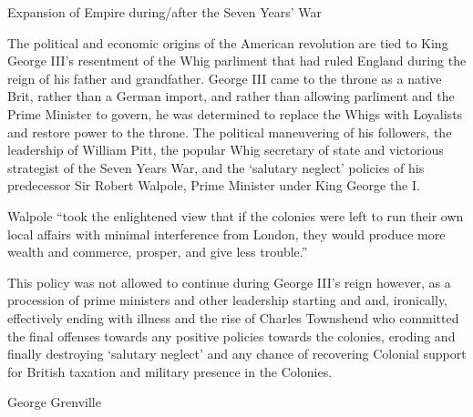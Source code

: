 \begin{quotation}\end{quotation}

Expansion of Empire during/after the Seven Years' War

\begin{quotation}\end{quotation}

The political and economic origins of the American revolution are tied to King
George III's resentment of the Whig parliment that had ruled England during the
reign of his father and grandfather. George III came to the throne as a native
Brit, rather than a German import, and rather than allowing parliment and the
Prime Minister to govern, he was determined to replace the Whigs with Loyalists
and restore power to the throne. The political maneuvering of his followers,
the leadership of William Pitt, the popular Whig secretary of state and
victorious strategist of the Seven Years War, and the `salutary
neglect'  policies of his predecessor Sir Robert Walpole, Prime Minister under
King George the I.\cite[Ch 1-4]{cook_long_1995}

Walpole ``took the enlightened view that if the colonies were left to run their
own local affairs with minimal interference from London, they would produce more
wealth and commerce, prosper, and give less trouble.''\cite[p. 3]{cook_long_1995}

This policy was not allowed to continue during George III's reign however, as a
procession of prime ministers and other leadership starting and  and,
ironically, effectively ending with  illness and the rise of Charles
Townshend who committed the final offenses towards any positive policies towards
the colonies, eroding and finally destroying `salutary neglect' and
any chance of recovering Colonial support for British taxation and military
presence in the Colonies.

George Grenville

